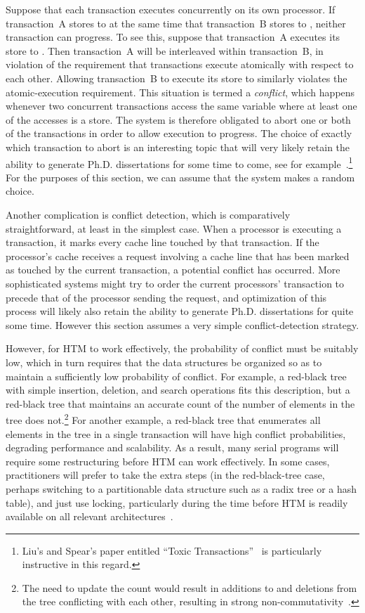 Suppose that each transaction executes concurrently on its own processor.
If transaction~A stores to  at the same time that transaction~B
stores to , neither transaction can progress.
To see this, suppose that transaction~A executes its store to .
Then transaction~A will be interleaved within transaction~B, in violation
of the requirement that transactions execute atomically with respect to
each other.
Allowing transaction~B to execute its store to  similarly violates
the atomic-execution requirement.
This situation is termed a \emph{conflict}, which happens whenever two
concurrent transactions access the same variable where at least one of
the accesses is a store.
The system is therefore obligated to abort one or both of the transactions
in order to allow execution to progress.
The choice of exactly which transaction to abort is an interesting topic
that will very likely retain the ability to generate Ph.D. dissertations for
some time to come, see for
example~\cite{EgeAkpinar2011HTM2TLE}.\footnote{
	Liu's and Spear's paper entitled ``Toxic
	Transactions''~\cite{YujieLiu2011ToxicTransactions} is
	particularly instructive in this regard.}
For the purposes of this section, we can assume that the system makes
a random choice.

Another complication is conflict detection, which is comparatively
straightforward, at least in the simplest case.
When a processor is executing a transaction, it marks every cache line
touched by that transaction.
If the processor's cache receives a request involving a cache line that
has been marked as touched by the current transaction, a potential
conflict has occurred.
More sophisticated systems might try to order the current processors'
transaction to precede that of the processor sending the request,
and optimization of this process will likely also retain the ability
to generate Ph.D. dissertations for quite some time.
However this section assumes a very simple conflict-detection strategy.

However, for HTM to work effectively, the probability of conflict must
be suitably low, which in turn requires that the data structures
be organized so as to maintain a sufficiently low probability of conflict.
For example, a red-black tree with simple insertion, deletion, and search
operations fits this description, but a red-black
tree that maintains an accurate count of the number of elements in
the tree does not.\footnote{
	The need to update the count would result in additions to and
	deletions from the tree conflicting with each other, resulting
	in strong non-commutativity~\cite{HagitAttiya2011LawsOfOrder,Attiya:2011:LOE:1925844.1926442,PaulEMcKenney2011SNC}.}
For another example, a red-black tree that enumerates all elements in
the tree in a single transaction will have high conflict probabilities,
degrading performance and scalability.
As a result, many serial programs will require some restructuring before
HTM can work effectively.
In some cases, practitioners will prefer to take the extra steps
(in the red-black-tree case, perhaps switching to a partitionable
data structure such as a radix tree or a hash table), and just
use locking, particularly during the time before HTM is readily available
on all relevant
architectures~\cite{CliffClick2009AzulHTM}.

